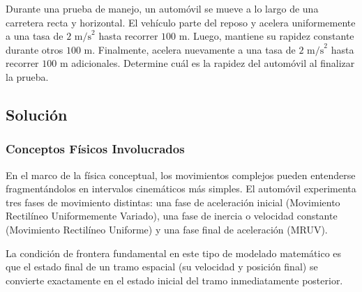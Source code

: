 \documentclass[12pt, a4paper]{article}
\begin{document}
Durante una prueba de manejo, un automóvil se mueve a lo largo de una carretera recta y horizontal. El vehículo parte del reposo y acelera uniformemente a una tasa de $2 \text{ m/s}^2$ hasta recorrer $100 \text{ m}$. Luego, mantiene su rapidez constante durante otros $100 \text{ m}$. Finalmente, acelera nuevamente a una tasa de $2 \text{ m/s}^2$ hasta recorrer $100 \text{ m}$ adicionales. Determine cuál es la rapidez del automóvil al finalizar la prueba.

\vspace{0.5cm}

\begin{center}
\end{center}

\subsection*{Solución}

\subsubsection*{Conceptos Físicos Involucrados}

En el marco de la física conceptual, los movimientos complejos pueden entenderse fragmentándolos en intervalos cinemáticos más simples. El automóvil experimenta tres fases de movimiento distintas: una fase de aceleración inicial (Movimiento Rectilíneo Uniformemente Variado), una fase de inercia o velocidad constante (Movimiento Rectilíneo Uniforme) y una fase final de aceleración (MRUV). 

La condición de frontera fundamental en este tipo de modelado matemático es que el estado final de un tramo espacial (su velocidad y posición final) se convierte exactamente en el estado inicial del tramo inmediatamente posterior.
\end{document}

